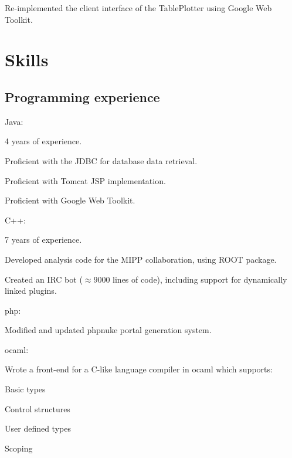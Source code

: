 \documentclass{resume}
\begin{document}
\begin{compactitem}
  \item Re-implemented the client interface of the TablePlotter using Google Web Toolkit.
\end{compactitem}

\section{Skills}

\subsection{Programming experience}
\begin{compactitem}
  \item{Java:}
  \begin{compactitem}
    \item 4 years of experience.
    \item Proficient with the JDBC for database data retrieval. 
    \item Proficient with Tomcat JSP implementation.
    \item Proficient with Google Web Toolkit.
  \end{compactitem}

  \item{C++:}
  \begin{compactitem}
    \item 7 years of experience.
    \item Developed analysis code for the MIPP collaboration, using ROOT package.
    \item Created an IRC bot ($\approx 9000$ lines of code), including support for dynamically linked plugins.
  \end{compactitem}
  \item{php:}
  \begin{compactitem}
    \item Modified and updated phpnuke portal generation system.
  \end{compactitem}
  \item{ocaml:}
  \begin{compactitem}
    \item Wrote a front-end for a C-like language compiler in ocaml which supports:
    \begin{compactitem}
      \item Basic types
      \item Control structures
      \item User defined types
      \item Scoping
    \end{compactitem}
  \end{compactitem}
\end{compactitem}
\end{document}

